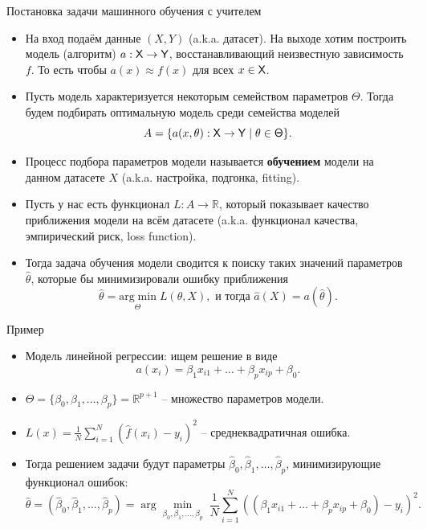 \documentclass[9pt]{beamer}
\begin{document}
\begin{frame}{Постановка задачи машинного обучения с учителем}
\begin{itemize}
    \item На вход подаём данные $(X, Y)$ (a.k.a. датасет). На выходе хотим построить модель (алгоритм) $a: \sf{X}\rightarrow \sf{Y}$, восстанавливающий неизвестную зависимость $f$. То есть чтобы $a(x) \approx f(x)$ для всех $x\in\sf{X}$.
    \item Пусть модель характеризуется некоторым семейством параметров $\Theta$. Тогда будем подбирать оптимальную модель среди семейства моделей
    $$A = \{a(x, \theta): \sf{X} \rightarrow \sf{Y}\; |\; \theta \in \sf{\Theta}\}.$$
    \item Процесс подбора параметров модели называется \textbf{обучением} модели на данном датасете $X$ (a.k.a. настройка, подгонка, fitting).
    \item Пусть у нас есть функционал $L: A\rightarrow \mathbb{R}$, который показывает качество приближения модели на всём датасете (a.k.a. функционал качества, эмпирический риск, loss function). 
    \item Тогда задача обучения модели сводится к поиску таких значений параметров $\hat\theta$, которые бы минимизировали ошибку приближения
    $$\hat \theta = \underset{\Theta}{\mathrm{arg\;min}}\;L(\theta, X), \text{ и тогда } \hat a(X) = a(\hat \theta).$$
\end{itemize}
\end{frame}

\begin{frame}{Пример}
\begin{itemize}
    \item Модель линейной регрессии: ищем решение в виде
    $$a(x_i) = \beta_1 x_{i1} + \ldots + \beta_p {x_{ip}} + \beta_0.$$
    \item $\Theta = \{\beta_0, \beta_1, \ldots, \beta_p\} = \mathbb{R}^{p+1}$ -- множество параметров модели.
    \item $L(x) = \frac{1}{N}\sum\limits_{i=1}^N(\hat f(x_i) - y_i)^2$ -- среднеквадратичная ошибка.
    \item Тогда решением задачи будут параметры $\hat\beta_0, \hat\beta_1, \ldots, \hat\beta_p$, минимизирующие функционал ошибок:
    $$\hat\theta = (\hat\beta_0, \hat\beta_1, \ldots, \hat\beta_p) = {\arg\min_{\beta_0, \beta_1,\ldots, \beta_p}}\;  \frac{1}{N}\sum\limits_{i=1}^N( (\beta_1 x_{i1}  + \ldots + \beta_p x_{ip} + \beta_0) - y_i)^2.$$
\end{itemize}
\end{frame}
\end{document}
